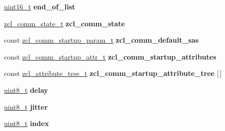 \begin{DoxyCompactItemize}
\begin{tabbing}
\end{tabbing}\item 
\mbox{\label{group__zcl__commissioning_ga2066d4a3853d4b0d8de8b162f829e10f}} 
\hyperlink{group__hal__dos_ga5a8b2dc9e45a9ee81a94ef304fb62505}{uint16\+\_\+t} {\bfseries end\+\_\+of\+\_\+list}
\item 
\mbox{\label{group__zcl__commissioning_ga19d5f58d61bf7ad0d29386bc11aa48ae}} 
\hyperlink{structzcl__comm__state__t}{zcl\+\_\+comm\+\_\+state\+\_\+t} {\bfseries zcl\+\_\+comm\+\_\+state}
\item 
\mbox{\label{group__zcl__commissioning_gac264b7287d217a88553dd4c9b032ab65}} 
const \hyperlink{structzcl__comm__startup__param__t}{zcl\+\_\+comm\+\_\+startup\+\_\+param\+\_\+t} {\bfseries zcl\+\_\+comm\+\_\+default\+\_\+sas}
\item 
\mbox{\label{group__zcl__commissioning_gaa88e1b649cac11f8c31f63305ad3ca2d}} 
const \hyperlink{structzcl__comm__startup__attr__t}{zcl\+\_\+comm\+\_\+startup\+\_\+attr\+\_\+t} {\bfseries zcl\+\_\+comm\+\_\+startup\+\_\+attributes}
\item 
\mbox{\label{group__zcl__commissioning_ga730f27745b94d4b42586f78b880ee65f}} 
const \hyperlink{structzcl__attribute__tree__t}{zcl\+\_\+attribute\+\_\+tree\+\_\+t} {\bfseries zcl\+\_\+comm\+\_\+startup\+\_\+attribute\+\_\+tree} \mbox{[}$\,$\mbox{]}
\item 
\mbox{\label{group__zcl__commissioning_ga70fbd315df33bf9039e036725b569e7f}} 
\hyperlink{group__hal__dos_gae1affc9ca37cfb624959c866a73f83c2}{uint8\+\_\+t} {\bfseries delay}
\item 
\mbox{\label{group__zcl__commissioning_gadf513be840f5d188d2adcd3045bff65c}} 
\hyperlink{group__hal__dos_gae1affc9ca37cfb624959c866a73f83c2}{uint8\+\_\+t} {\bfseries jitter}
\item 
\mbox{\label{group__zcl__commissioning_gaae5a12e607d0f782506d9e6ec6179c64}} 
\hyperlink{group__hal__dos_gae1affc9ca37cfb624959c866a73f83c2}{uint8\+\_\+t} {\bfseries index}
\end{DoxyCompactItemize}


